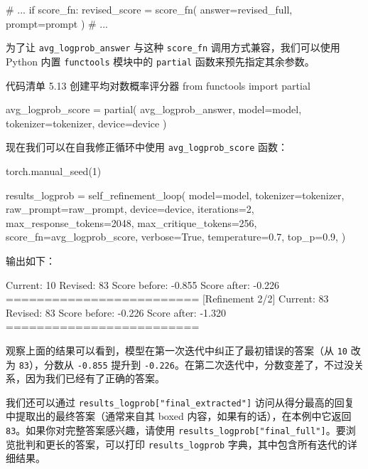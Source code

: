 \begin{codebox}
# ...
        if score_fn:
            revised_score = score_fn(
                answer=revised_full, prompt=prompt
            )
# ...
\end{codebox}

为了让 \texttt{avg\_logprob\_answer} 与这种 \texttt{score\_fn} 调用方式兼容，我们可以使用 Python 内置 \texttt{functools} 模块中的 \texttt{partial} 函数来预先指定其余参数。

\begin{codeboxt}{代码清单 5.13 创建平均对数概率评分器}
from functools import partial

avg_logprob_score = partial(
    avg_logprob_answer,
    model=model,
    tokenizer=tokenizer,
    device=device
)
\end{codeboxt}

现在我们可以在自我修正循环中使用 \texttt{avg\_logprob\_score} 函数：

\begin{codebox}
torch.manual_seed(1)

results_logprob = self_refinement_loop(
    model=model,
    tokenizer=tokenizer,
    raw_prompt=raw_prompt,
    device=device,
    iterations=2,
    max_response_tokens=2048,
    max_critique_tokens=256,
    score_fn=avg_logprob_score,
    verbose=True,
    temperature=0.7,
    top_p=0.9,
)
\end{codebox}

输出如下：

\begin{codebox}
[Refinement 1/2]
Current: 10
Revised: 83
Score before: -0.855
Score after: -0.226
=========================
[Refinement 2/2]
Current: 83
Revised: 83
Score before: -0.226
Score after: -1.320
=========================
\end{codebox}

观察上面的结果可以看到，模型在第一次迭代中纠正了最初错误的答案（从 \texttt{10} 改为 \texttt{83}），分数从 \texttt{-0.855} 提升到 \texttt{-0.226}。在第二次迭代中，分数变差了，不过没关系，因为我们已经有了正确的答案。

我们还可以通过 \texttt{results\_logprob[}\texttt{"}\texttt{final\_extracted}\texttt{"}\texttt{]} 访问从得分最高的回复中提取出的最终答案（通常来自其 boxed 内容，如果有的话），在本例中它返回 \texttt{83}。如果你对完整答案感兴趣，请使用 \texttt{results\_logprob[}\texttt{"}\texttt{final\_full}\texttt{"}\texttt{]}。要浏览批判和更长的答案，可以打印 \texttt{results\_logprob} 字典，其中包含所有迭代的详细结果。

